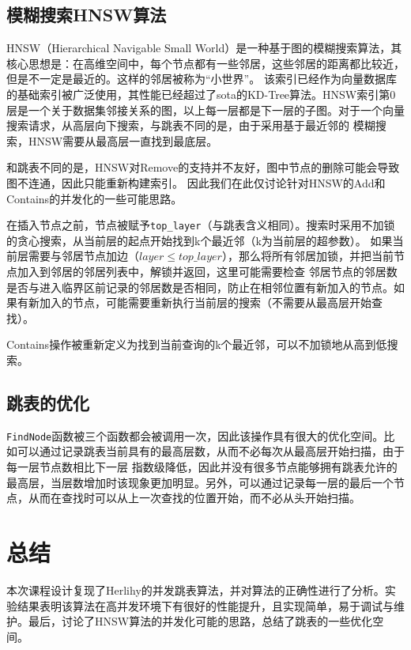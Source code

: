\documentclass[UTF8, 10pt, twocolumn]{article}
\begin{document}
\subsection{模糊搜索HNSW算法}
HNSW（Hierarchical Navigable Small World）\cite{malkov_efficient_2020}是一种基于图的模糊搜索算法，其核心思想是：在高维空间中，每个节点都有一些邻居，这些邻居的距离都比较近，但是不一定是最近的。这样的邻居被称为“小世界”。
该索引已经作为向量数据库的基础索引被广泛使用，其性能已经超过了sota的KD-Tree算法。HNSW索引第0层是一个关于数据集邻接关系的图，以上每一层都是下一层的子图。对于一个向量搜索请求，从高层向下搜索，与跳表不同的是，由于采用基于最近邻的
模糊搜索，HNSW需要从最高层一直找到最底层。

和跳表不同的是，HNSW对Remove的支持并不友好，图中节点的删除可能会导致图不连通，因此只能重新构建索引。
因此我们在此仅讨论针对HNSW的Add和Contains的并发化的一些可能思路。

在插入节点之前，节点被赋予\verb|top_layer|（与跳表含义相同）。搜索时采用不加锁的贪心搜索，从当前层的起点开始找到k个最近邻（k为当前层的超参数）。
如果当前层需要与邻居节点加边（$layer \leq top\_layer$），那么将所有邻居加锁，并把当前节点加入到邻居的邻居列表中，解锁并返回，这里可能需要检查
邻居节点的邻居数是否与进入临界区前记录的邻居数是否相同，防止在相邻位置有新加入的节点。如果有新加入的节点，可能需要重新执行当前层的搜索（不需要从最高层开始查找）。

Contains操作被重新定义为找到当前查询的k个最近邻，可以不加锁地从高到低搜索。

\subsection{跳表的优化}
\verb|FindNode|函数被三个函数都会被调用一次，因此该操作具有很大的优化空间。比如可以通过记录跳表当前具有的最高层数，从而不必每次从最高层开始扫描，由于每一层节点数相比下一层
指数级降低，因此并没有很多节点能够拥有跳表允许的最高层，当层数增加时该现象更加明显。另外，可以通过记录每一层的最后一个节点，从而在查找时可以从上一次查找的位置开始，而不必从头开始扫描。

\section{总结}
本次课程设计复现了Herlihy的并发跳表算法，并对算法的正确性进行了分析。实验结果表明该算法在高并发环境下有很好的性能提升，且实现简单，易于调试与维护。最后，讨论了HNSW算法的并发化可能的思路，总结了跳表的一些优化空间。



\end{document}
